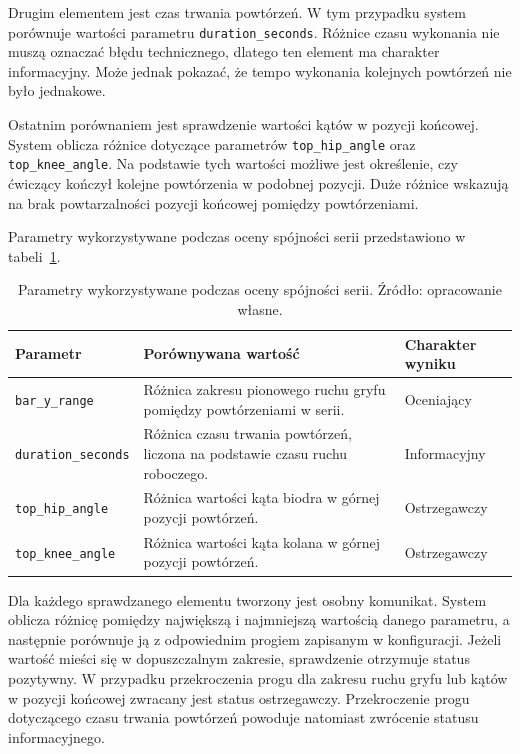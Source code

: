 Drugim elementem jest czas trwania powtórzeń. W tym przypadku system porównuje wartości parametru \texttt{duration\_seconds}. Różnice czasu wykonania nie muszą oznaczać błędu technicznego, dlatego ten element ma charakter informacyjny. Może jednak pokazać, że tempo wykonania kolejnych powtórzeń nie było jednakowe.

Ostatnim porównaniem jest sprawdzenie wartości kątów w pozycji końcowej. System oblicza różnice dotyczące parametrów \texttt{top\_hip\_angle} oraz \texttt{top\_knee\_angle}. Na podstawie tych wartości możliwe jest określenie, czy ćwiczący kończył kolejne powtórzenia w podobnej pozycji. Duże różnice wskazują na brak powtarzalności pozycji końcowej pomiędzy powtórzeniami.

Parametry wykorzystywane podczas oceny spójności serii przedstawiono w tabeli~\ref{tab:parametry-spojnosci-serii}.

\begin{table}[H]
\centering
\caption{Parametry wykorzystywane podczas oceny spójności serii. Źródło: opracowanie własne.}
\label{tab:parametry-spojnosci-serii}
\vspace{0.3cm}
\footnotesize
\renewcommand{\arraystretch}{1.25}
\begin{tabular}{|p{3.6cm}|p{6.3cm}|p{3.7cm}|}
\hline
\textbf{Parametr} & \textbf{Porównywana wartość} & \textbf{Charakter wyniku} \\
\hline

\texttt{bar\_y\_range} & Różnica zakresu pionowego ruchu gryfu pomiędzy powtórzeniami w serii. & Oceniający \\
\hline

\texttt{duration\_seconds} & Różnica czasu trwania powtórzeń, liczona na podstawie czasu ruchu roboczego. & Informacyjny \\
\hline

\texttt{top\_hip\_angle} & Różnica wartości kąta biodra w górnej pozycji powtórzeń. & Ostrzegawczy \\
\hline

\texttt{top\_knee\_angle} & Różnica wartości kąta kolana w górnej pozycji powtórzeń. & Ostrzegawczy \\
\hline

\end{tabular}
\end{table}

Dla każdego sprawdzanego elementu tworzony jest osobny komunikat. System oblicza różnicę pomiędzy największą i najmniejszą wartością danego parametru, a następnie porównuje ją z odpowiednim progiem zapisanym w konfiguracji. Jeżeli wartość mieści się w dopuszczalnym zakresie, sprawdzenie otrzymuje status pozytywny. W przypadku przekroczenia progu dla zakresu ruchu gryfu lub kątów w pozycji końcowej zwracany jest status ostrzegawczy. Przekroczenie progu dotyczącego czasu trwania powtórzeń powoduje natomiast zwrócenie statusu informacyjnego.

